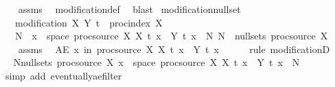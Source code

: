 \begin{isabellebody}
%
\isadelimproof
\ \ %
\endisadelimproof
%
\isatagproof
{}\isamarkupfalse%
\ assms\ \isamarkupfalse%
\ modification{\isacharunderscore}{\kern0pt}def\ \isamarkupfalse%
\ blast{\isacharplus}{\kern0pt}%
\endisatagproof
{\isafoldproof}%
%
\isadelimproof
\isanewline
%
\endisadelimproof
\isanewline
{}\isamarkupfalse%
\ modification{\isacharunderscore}{\kern0pt}null{\isacharunderscore}{\kern0pt}set{\isacharcolon}{\kern0pt}\isanewline
\ \ \ {\isachardoublequoteopen}modification\ X\ Y{\isachardoublequoteclose}\ {\isachardoublequoteopen}t\ {\isasymin}\ proc{\isacharunderscore}{\kern0pt}index\ X{\isachardoublequoteclose}\isanewline
\ \ \ N\ \ {\isachardoublequoteopen}{\isacharbraceleft}{\kern0pt}x\ {\isasymin}\ space\ {\isacharparenleft}{\kern0pt}proc{\isacharunderscore}{\kern0pt}source\ X{\isacharparenright}{\kern0pt}{\isachardot}{\kern0pt}\ X\ t\ x\ {\isasymnoteq}\ Y\ t\ x{\isacharbraceright}{\kern0pt}\ {\isasymsubseteq}\ N{\isachardoublequoteclose}\ {\isachardoublequoteopen}N\ {\isasymin}\ null{\isacharunderscore}{\kern0pt}sets\ {\isacharparenleft}{\kern0pt}proc{\isacharunderscore}{\kern0pt}source\ X{\isacharparenright}{\kern0pt}{\isachardoublequoteclose}\isanewline
%
\isadelimproof
%
\endisadelimproof
%
\isatagproof
{}\isamarkupfalse%
\ {\isacharminus}{\kern0pt}\isanewline
\ \ \isamarkupfalse%
\ assms\ \isamarkupfalse%
\ {\isachardoublequoteopen}AE\ x\ in\ proc{\isacharunderscore}{\kern0pt}source\ X{\isachardot}{\kern0pt}\ X\ t\ x\ {\isacharequal}{\kern0pt}\ Y\ t\ x{\isachardoublequoteclose}\isanewline
\ \ \ \ \isamarkupfalse%
\ {\isacharparenleft}{\kern0pt}rule\ modificationD{\isacharparenleft}{\kern0pt}{}{\isacharparenright}{\kern0pt}{\isacharparenright}{\kern0pt}\isanewline
\ \ \isamarkupfalse%
\ \isamarkupfalse%
\ {\isachardoublequoteopen}{\isasymexists}N{\isasymin}null{\isacharunderscore}{\kern0pt}sets\ {\isacharparenleft}{\kern0pt}proc{\isacharunderscore}{\kern0pt}source\ X{\isacharparenright}{\kern0pt}{\isachardot}{\kern0pt}\ {\isacharbraceleft}{\kern0pt}x\ {\isasymin}\ space\ {\isacharparenleft}{\kern0pt}proc{\isacharunderscore}{\kern0pt}source\ X{\isacharparenright}{\kern0pt}{\isachardot}{\kern0pt}\ X\ t\ x\ {\isasymnoteq}\ Y\ t\ x{\isacharbraceright}{\kern0pt}\ {\isasymsubseteq}\ N{\isachardoublequoteclose}\isanewline
\ \ \ \ \isamarkupfalse%
\ {\isacharparenleft}{\kern0pt}simp\ add{\isacharcolon}{\kern0pt}\ eventually{\isacharunderscore}{\kern0pt}ae{\isacharunderscore}{\kern0pt}filter{\isacharparenright}{\kern0pt}\isanewline

\end{isabellebody}
